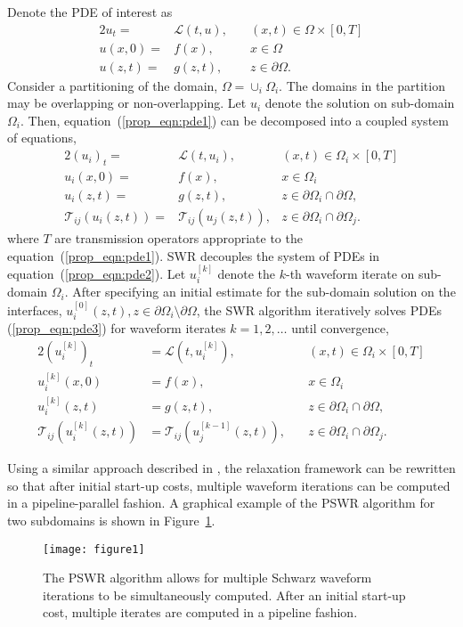 \documentclass{svmult-ddm}
\begin{document}
Denote the PDE of interest as 
\begin{alignat}{2}
  \label{prop_eqn:pde1}
  u_t =&  \mathcal{L}(t,u), \quad &(x,t)\in \Omega\times[0,T]\\
  \nonumber
  u(x,0) =& f(x), \quad &x \in \Omega \\
  \nonumber
  u(z,t) =& g(z,t), \quad &z \in \partial\Omega. 
\end{alignat}
Consider a partitioning of the domain, $\Omega = \cup_i\Omega_i$.
The domains in the partition may be overlapping or non-overlapping.
Let $u_i$ denote the solution on sub-domain $\Omega_i$.
Then, equation~(\ref{prop_eqn:pde1}) can be decomposed into a
coupled system of equations,
\begin{alignat}{2}
  \label{prop_eqn:pde2}
  (u_i)_t =&  \mathcal{L}(t,u_i), &(x,t)\in \Omega_i\times[0,T]\\
  \nonumber
  u_i(x,0) =& f(x),  &x \in \Omega_i \\
  \nonumber
  u_i(z,t) =& g(z,t),  &z \in \partial\Omega_i\cap\partial\Omega, \\
  \nonumber
  \mathcal{T}_{ij}(u_{i}(z,t)) =& \mathcal{T}_{ij}(u_{j}(z,t)), &z \in \partial\Omega_i\cap\partial\Omega_j.
\end{alignat}
where $T$ are transmission operators appropriate to the
equation~(\ref{prop_eqn:pde1}).  SWR decouples the system of
PDEs in equation~(\ref{prop_eqn:pde2}).  Let $u_i^{[k]}$
denote the $k$-th waveform iterate on sub-domain $\Omega_i$. After
specifying an initial estimate for the sub-domain solution on the
interfaces, $u_i^{[0]}(z,t),
z\in\partial\Omega_i\setminus\partial\Omega$, the SWR algorithm
iteratively solves PDEs (\ref{prop_eqn:pde3}) for waveform
iterates $k=1,2,\ldots$ until convergence,
\begin{alignat}{2}
  \label{prop_eqn:pde3}
  (u_i^{[k]})_t &=  \mathcal{L}(t,u_i^{[k]}), \quad &(x,t)\in \Omega_i\times[0,T]\\
  \nonumber
  u_i^{[k]}(x,0) &= f(x), \quad &x \in \Omega_i \\
  \nonumber
  u_i^{[k]}(z,t) &= g(z,t), \quad &z \in \partial\Omega_i\cap\partial\Omega, \\
  \nonumber
  \mathcal{T}_{ij}(u_{i}^{[k]}(z,t)) &= \mathcal{T}_{ij}(u_{j}^{[k-1]}(z,t)), \quad &z \in \partial\Omega_i\cap\partial\Omega_j.
\end{alignat}


Using a similar approach described in
\cite{ChristliebMacdonaldOng2010,MR1340665}, the relaxation framework can be
rewritten so that after initial start-up costs, multiple waveform
iterations can be computed in a pipeline-parallel fashion. A graphical
example of the PSWR algorithm for two subdomains is shown in
Figure~\ref{prop_sec:pswr_fig}.
\begin{figure}
  \centering
  \texttt{[image: figure1]}
  \caption{The PSWR algorithm allows for multiple Schwarz waveform
    iterations to be simultaneously computed.  After an initial
    start-up cost, multiple iterates are computed in a pipeline
    fashion.}
  \label{prop_sec:pswr_fig}
\end{figure}
\end{document}
